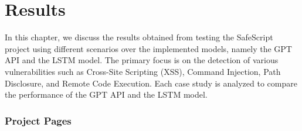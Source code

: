 \chapter{Results}\label{chap:results}

In this chapter, we discuss the results obtained from testing the SafeScript project using different scenarios over the implemented models, 
namely the GPT API and the LSTM model. The primary focus is on the detection of various vulnerabilities such as Cross-Site Scripting (XSS), 
Command Injection, Path Disclosure, and Remote Code Execution. 
Each case study is analyzed to compare the performance of the GPT API and the LSTM model.

\subsection{Project Pages}

